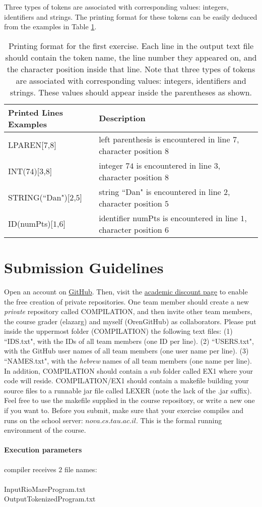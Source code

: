 \documentclass{article}
\begin{document}
Three types of tokens are associated with corresponding values: integers, identifiers and strings.
The printing format for these tokens can be easily deduced from the examples in Table \ref{Table_Token_Printing_Examples_For_Exercise_1}.
\begin{table}[h]
\centering
\begin{tabular}{|l|l| }
  Printed Lines Examples & Description \\
  \hline
  \hline
  LPAREN[$7$,$8$] & left parenthesis is encountered in line $7$, character position $8$ \\
  \hline
  INT($74$)[$3$,$8$] & integer $74$ is encountered in line $3$, character position $8$ \\
  \hline
  STRING(``Dan")[$2$,$5$] & string ``Dan" is encountered in line $2$, character position $5$ \\
  \hline
  ID(numPts)[$1$,$6$] & identifier numPts is encountered in line $1$, character position $6$ \\
  \hline
\end{tabular}
\caption{
Printing format for the first exercise.
Each line in the output text file should contain the token name,
the line number they appeared on, and the character position inside that line.
Note that three types of tokens are associated with corresponding values:
integers, identifiers and strings.
These values should appear inside the parentheses as shown.
\label{Table_Token_Printing_Examples_For_Exercise_1}}
\end{table}

\section{Submission Guidelines}
Open an account on \href{https://github.com/}{GitHub}.
Then, visit the
\href{https://education.github.com/discount_requests/new}{academic discount page}
to enable the free creation of private repositories.
One team member should create a new \textit{private} repository called COMPILATION,
and then invite other team members, the course grader (elazarg) and myself (OrenGitHub)
as collaborators.
Please put inside the uppermost folder (COMPILATION) the following text files:
(1) ``IDS.txt", with the IDs of all team members (one ID per line).
(2) ``USERS.txt", with the GitHub user names of all team members (one user name per line).
(3) ``NAMES.txt", with the \textit{hebrew} names of all team members (one name per line).
In addition, COMPILATION should contain a sub folder called EX1
where your code will reside.
COMPILATION/EX1 should contain a makefile building your source files to a
runnable jar file called LEXER (note the lack of the .jar suffix).
Feel free to use the makefile supplied in the course repository,
or write a new one if you want to. 
Before you submit, make sure that your exercise compiles and runs
on the school server: $nova.cs.tau.ac.il$.
This is the formal running environment of the course.
\paragraph{Execution parameters}
compiler receives $2$ file names:\\ \\
InputRioMareProgram.txt\\
OutputTokenizedProgram.txt
\end{document}
